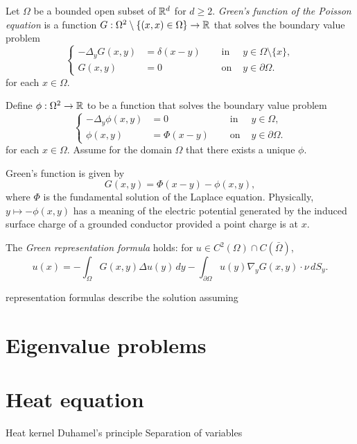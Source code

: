 \documentclass{../../large}
\begin{document}
\begin{prb}
Let $\Omega$ be a bounded open subset of $\mathbb{R}^d$ for $d\ge2$.
\emph{Green's function of the Poisson equation} is a function $G:\Omega^2\setminus\{(x,x)\in\Omega\}\to\mathbb{R}$ that solves the boundary value problem
\[\left\{\begin{alignedat}{2}
-\Delta_yG(x,y)&=\delta(x-y)\quad & \text{ in }&y\in\Omega\setminus\{x\},\\
G(x,y)&=0 & \text{ on }&y\in\partial\Omega.
\end{alignedat}\right.\]
for each $x\in\Omega$.

Define $\phi:\Omega^2\to\mathbb{R}$ to be a function that solves the boundary value problem
\[\left\{\begin{alignedat}{2}
-\Delta_y\phi(x,y)&=0 & \text{ in }&y\in\Omega,\\
\phi(x,y)&=\Phi(x-y)\quad & \text{ on }&y\in\partial\Omega.
\end{alignedat}\right.\]
for each $x\in\Omega$.
Assume for the domain $\Omega$ that there exists a unique $\phi$.
\begin{parts}
\item Green's function is given by
\[G(x,y)=\Phi(x-y)-\phi(x,y),\]
where $\Phi$ is the fundamental solution of the Laplace equation.
Physically, $y\mapsto-\phi(x,y)$ has a meaning of the electric potential generated by the induced surface charge of a grounded conductor provided a point charge is at $x$.
\item The \emph{Green representation formula} holds: for $u\in C^2(\Omega)\cap C(\bar\Omega)$,
\[u(x)=-\int_\Omega G(x,y)\Delta u(y)\,dy-\int_{\partial\Omega}u(y)\nabla_yG(x,y)\cdot\nu\,dS_y.\]
\end{parts}
\end{prb}

\begin{prb}
representation formulas describe the solution assuming 

\end{prb}

\section{Eigenvalue problems}





\section{Heat equation}
Heat kernel
Duhamel's principle
Separation of variables
\end{document}
